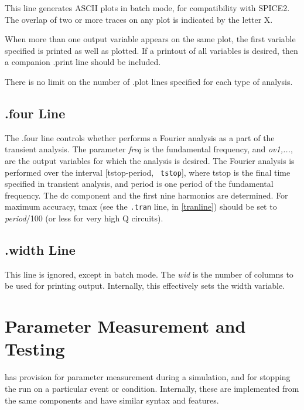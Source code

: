 This line generates ASCII plots in batch mode, for compatibility
with SPICE2.  The overlap of two or more traces on any plot is
indicated by the letter X.

When more than one output variable appears on the same plot, the first
variable specified is printed as well as plotted.  If a printout of
all variables is desired, then a companion {\vt .print} line should be
included.

There is no limit on the number of {\vt .plot} lines specified for
each type of analysis.

\subsection{{\vt .four} Line}

The {\vt .four} line controls whether {\WRspice} performs a Fourier
analysis as a part of the transient analysis.  The parameter {\it
freq\/} is the fundamental frequency, and {\it ov1,...\/}, are the
output variables for which the analysis is desired.  The Fourier
analysis is performed over the interval [{\vt tstop}-period, {\tt
tstop}], where {\vt tstop} is the final time specified in transient
analysis, and {\vt period} is one period of the fundamental frequency. 
The dc component and the first nine harmonics are determined.  For
maximum accuracy, {\vt tmax} (see the {\tt .tran} line, in
\ref{tranline}) should be set to {\it period}/100 (or less for very
high Q circuits).

\subsection{{\vt .width} Line}
This line is ignored, except in batch mode.  The {\it wid} is the
number of columns to be used for printing output.  Internally, this
effectively sets the {\et width} variable.


\section{Parameter Measurement and Testing}

{\WRspice} has provision for parameter measurement during a
simulation, and for stopping the run on a particular event or
condition.  Internally, these are implemented from the same components
and have similar syntax and features.

